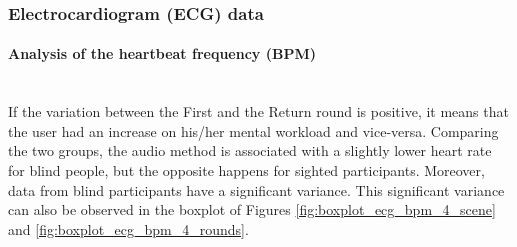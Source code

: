 \subsubsection{Electrocardiogram (ECG) data}
\label{subsubsec:results_ecg_2}

\paragraph*{Analysis of the heartbeat frequency (BPM)}\mbox{}\\

If the variation between the First and the Return round is positive, it means that the user had an increase on his/her mental workload and vice-versa. Comparing the two groups, the audio method is associated with a slightly lower heart rate for blind people, but the opposite happens for sighted participants. Moreover, data from blind participants have a significant variance. This significant variance can also be observed in the boxplot of Figures \ref{fig:boxplot_ecg_bpm_4_scene} and \ref{fig:boxplot_ecg_bpm_4_rounds}. 


